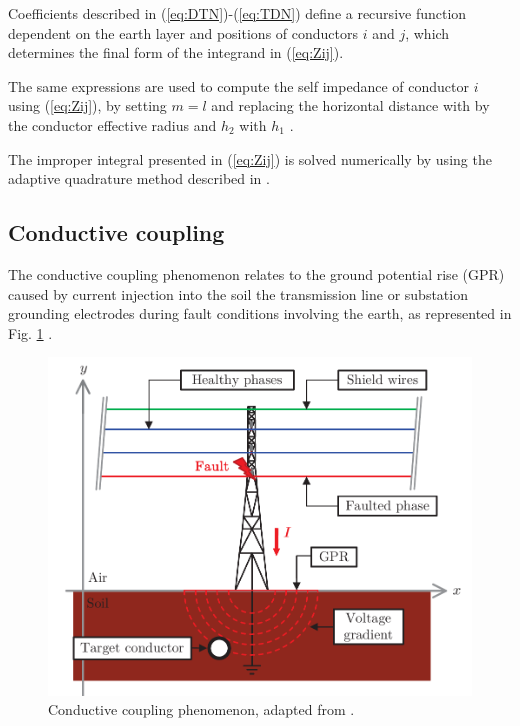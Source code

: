 \documentclass{IEEEtran4PSCC}
\begin{document}
Coefficients described in (\ref{eq:DTN})-(\ref{eq:TDN}) define a recursive function dependent on the earth layer and positions of conductors $i$ and $j$, which determines the final form of the integrand in (\ref{eq:Zij}). 

The same expressions are used to compute the self impedance of conductor $i$ using (\ref{eq:Zij}), by setting $m = l$ and replacing the horizontal distance with by the conductor effective radius and $h_{2}$ with $h_{1}$ \cite{Tsiamitros2008a}.

The improper integral presented in (\ref{eq:Zij}) is solved numerically by using the adaptive quadrature method described in \cite{Shampine2008}.



\subsection{Conductive coupling}

The conductive coupling phenomenon relates to the ground potential rise (GPR) caused by current injection into the soil the transmission line or substation grounding electrodes during fault conditions involving the earth, as represented in Fig. \ref{fig:ConductiveCoupling} \cite{CIGREWG36}.

\begin{figure}[hbt]
	\begin{center}
		\includegraphics[width=1\columnwidth]{./fig/condu_coup2.pdf}
		\caption{Conductive coupling phenomenon, adapted from \cite{Martins-Britto2020}.}
		\label{fig:ConductiveCoupling}
	\end{center}
\end{figure} 
\end{document}
